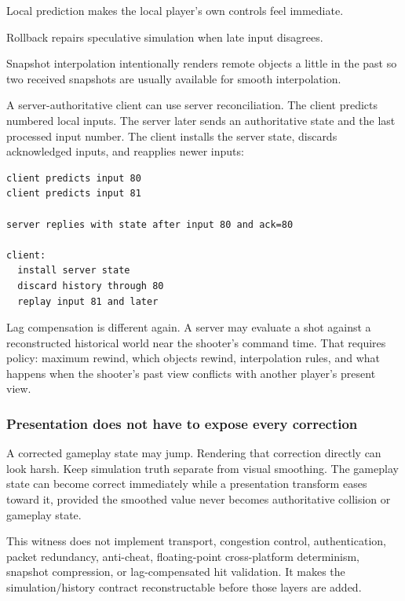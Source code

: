\hypertarget{06-engine-ii-ch047-prediction-rollback-interpolation-and-reconciliation-are-different-tools}{}

Local prediction makes the local player's own controls feel immediate.

Rollback repairs speculative simulation when late input disagrees.

Snapshot interpolation intentionally renders remote objects a little in the past so two received snapshots are usually available for smooth interpolation.

A server-authoritative client can use server reconciliation. The client predicts numbered local inputs. The server later sends an authoritative state and the last processed input number. The client installs the server state, discards acknowledged inputs, and reapplies newer inputs:

\begin{verbatim}
client predicts input 80
client predicts input 81

server replies with state after input 80 and ack=80

client:
  install server state
  discard history through 80
  replay input 81 and later
\end{verbatim}

Lag compensation is different again. A server may evaluate a shot against a reconstructed historical world near the shooter's command time. That requires policy: maximum rewind, which objects rewind, interpolation rules, and what happens when the shooter's past view conflicts with another player's present view.

\subsubsection{Presentation does not have to expose every correction}\label{06-engine-ii-ch047-presentation-does-not-have-to-expose-every-correction}

\hypertarget{06-engine-ii-ch047-presentation-does-not-have-to-expose-every-correction}{}

A corrected gameplay state may jump. Rendering that correction directly can look harsh. Keep simulation truth separate from visual smoothing. The gameplay state can become correct immediately while a presentation transform eases toward it, provided the smoothed value never becomes authoritative collision or gameplay state.

This witness does not implement transport, congestion control, authentication, packet redundancy, anti-cheat, floating-point cross-platform determinism, snapshot compression, or lag-compensated hit validation. It makes the simulation/history contract reconstructable before those layers are added.

